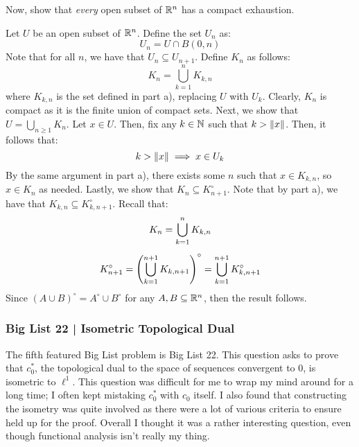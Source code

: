 \begin{qu}[num=19.2]
    Now, show that \textit{every} open subset of $ \mathbb{R}^{n} $ has a compact
    exhaustion.
\end{qu}

\begin{soln}
    Let $ U $ be an open subset of $ \mathbb{R}^{n} $. Define the set $ U_{n} $ as:
    \begin{equation*}
        U_{n} = U \cap B(0, n)
    \end{equation*}
    Note that for all $ n $, we have that $ U_{n} \subseteq U_{n+1} $.
    Define $ K_{n} $ as follows:
    \begin{equation*}
        K_{n} = \bigcup_{k=1}^{n} K_{k, n}
    \end{equation*}
    where $ K_{k, n} $ is the set defined in part a), replacing $ U $ with
    $ U_{k} $. Clearly, $ K_{n} $ is compact as it is the finite union of
    compact sets. Next, we show that $ U = \bigcup_{n \geq 1} K_{n} $. \vsp
    Let $ x \in U $. Then, fix any $ k \in \mathbb{N} $ such that $ k > \left\|x\right\| $.
    Then, it follows that:
    \begin{equation*}
        k > \left\|x\right\| \implies x \in U_{k}
    \end{equation*}
    By the same argument in part a), there exists some $ n $ such that $ x \in
    K_{k, n} $, so $ x \in K_{n} $ as needed. \vsp
    Lastly, we show that $ K_{n} \subseteq K_{n+1}^{\circ} $.
    Note that by part a), we have that $ K_{k, n} \subseteq
    K_{k, n+1}^{\circ} $. Recall that:
    \begin{gather*}
        K_{n} = \bigcup_{k=1}^{n} K_{k, n} \vsp
        K_{n+1}^{\circ} = \left( \bigcup_{k=1}^{n+1}K_{k,n+1} \right)^{\circ}
        = \bigcup_{k=1}^{n+1}K_{k,n+1}^{\circ}
    \end{gather*}
    Since $ (A \cup B)^{\circ} = A^{\circ} \cup B^{\circ} $ for any
    $ A, B \subseteq \mathbb{R}^{n} $, then the result follows.
\end{soln}

\subsubsection{Big List 22 | Isometric Topological Dual}

The fifth featured Big List problem is Big List 22. This question asks to prove
that $ c_{0}^{*} $, the topological dual to the space of sequences convergent to
0, is isometric to $ \ell^{1} $. This question was difficult for me to wrap my
mind around for a long time; I often kept mistaking $ c_{0}^{*} $ with
$ c_{0} $ itself. I also found that constructing the isometry was quite involved
as there were a lot of various criteria to ensure held up for the proof. Overall
I thought it was a rather interesting question, even though functional analysis
isn't really my thing.

